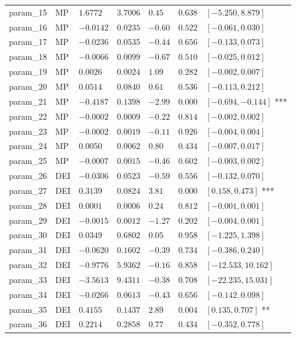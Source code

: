 \documentclass{article}
\begin{document}
\begin{longtable}{lllllll}
param\_15 & MP & $1.6772$ & $3.7006$ & $0.45$ & $0.638$ & $[-5.250, 8.879]$  \\
param\_16 & MP & $-0.0142$ & $0.0235$ & $-0.60$ & $0.522$ & $[-0.061, 0.030]$  \\
param\_17 & MP & $-0.0236$ & $0.0535$ & $-0.44$ & $0.656$ & $[-0.133, 0.073]$  \\
param\_18 & MP & $-0.0066$ & $0.0099$ & $-0.67$ & $0.510$ & $[-0.025, 0.012]$  \\
param\_19 & MP & $0.0026$ & $0.0024$ & $1.09$ & $0.282$ & $[-0.002, 0.007]$  \\
param\_20 & MP & $0.0514$ & $0.0840$ & $0.61$ & $0.536$ & $[-0.113, 0.212]$  \\
param\_21 & MP & $-0.4187$ & $0.1398$ & $-2.99$ & $0.000$ & $[-0.694, -0.144]$ *** \\
param\_22 & MP & $-0.0002$ & $0.0009$ & $-0.22$ & $0.814$ & $[-0.002, 0.002]$  \\
param\_23 & MP & $-0.0002$ & $0.0019$ & $-0.11$ & $0.926$ & $[-0.004, 0.004]$  \\
param\_24 & MP & $0.0050$ & $0.0062$ & $0.80$ & $0.434$ & $[-0.007, 0.017]$  \\
param\_25 & MP & $-0.0007$ & $0.0015$ & $-0.46$ & $0.602$ & $[-0.003, 0.002]$  \\
param\_26 & DEI & $-0.0306$ & $0.0523$ & $-0.59$ & $0.556$ & $[-0.132, 0.070]$  \\
param\_27 & DEI & $0.3139$ & $0.0824$ & $3.81$ & $0.000$ & $[0.158, 0.473]$ *** \\
param\_28 & DEI & $0.0001$ & $0.0006$ & $0.24$ & $0.812$ & $[-0.001, 0.001]$  \\
param\_29 & DEI & $-0.0015$ & $0.0012$ & $-1.27$ & $0.202$ & $[-0.004, 0.001]$  \\
param\_30 & DEI & $0.0349$ & $0.6802$ & $0.05$ & $0.958$ & $[-1.225, 1.398]$  \\
param\_31 & DEI & $-0.0620$ & $0.1602$ & $-0.39$ & $0.734$ & $[-0.386, 0.240]$  \\
param\_32 & DEI & $-0.9776$ & $5.9362$ & $-0.16$ & $0.858$ & $[-12.533, 10.162]$  \\
param\_33 & DEI & $-3.5613$ & $9.4311$ & $-0.38$ & $0.708$ & $[-22.235, 15.031]$  \\
param\_34 & DEI & $-0.0266$ & $0.0613$ & $-0.43$ & $0.656$ & $[-0.142, 0.098]$  \\
param\_35 & DEI & $0.4155$ & $0.1437$ & $2.89$ & $0.004$ & $[0.135, 0.707]$ ** \\
param\_36 & DEI & $0.2214$ & $0.2858$ & $0.77$ & $0.434$ & $[-0.352, 0.778]$  \\

\end{longtable}
\end{document}
